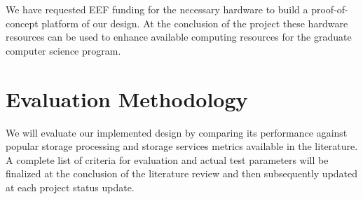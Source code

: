 \documentclass[11pt]{article}
\begin{document}
We have requested EEF funding for the necessary hardware to build
a proof-of-concept platform of our design.
At the conclusion of the project these hardware
resources can be used to enhance available computing resources for the
graduate computer science program.

\section{Evaluation Methodology}
We will evaluate our implemented design by
comparing its performance against popular storage processing and
storage services metrics available in the literature.
A complete list of criteria for evaluation and actual test parameters
will be finalized at the conclusion of the literature review and then
subsequently updated at each project status update.

\nocite{*}

\end{document}

